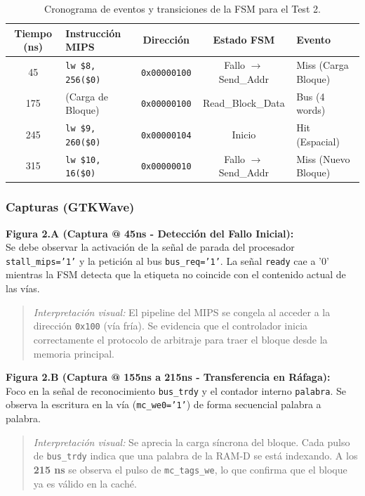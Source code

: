 \documentclass[12pt,a4paper]{article}
\begin{document}
\begin{table}[H]
\centering
\small
\renewcommand{\arraystretch}{1.2}
\begin{tabular}{|c|l|c|c|l|}
\hline
\rowcolor[HTML]{EFEFEF} 
\textbf{Tiempo (ns)} & \textbf{Instrucción MIPS} & \textbf{Dirección} & \textbf{Estado FSM} & \textbf{Evento} \\ \hline
45  & \texttt{lw \$8, 256(\$0)}  & \texttt{0x00000100} & Fallo $\rightarrow$ Send\_Addr & Miss (Carga Bloque) \\ \hline
175 & (Carga de Bloque)          & \texttt{0x00000100} & Read\_Block\_Data     & Bus (4 words)       \\ \hline
245 & \texttt{lw \$9, 260(\$0)}  & \texttt{0x00000104} & Inicio                & Hit (Espacial)      \\ \hline
315 & \texttt{lw \$10, 16(\$0)}  & \texttt{0x00000010} & Fallo $\rightarrow$ Send\_Addr & Miss (Nuevo Bloque) \\ \hline
\end{tabular}
\caption{Cronograma de eventos y transiciones de la FSM para el Test 2.}
\end{table}

\subsubsection{ Capturas (GTKWave)}

\textbf{Figura 2.A (Captura @ 45ns - Detección del Fallo Inicial):} \\
Se debe observar la activación de la señal de parada del procesador \texttt{stall\_mips='1'} y la petición al bus \texttt{bus\_req='1'}. La señal \texttt{ready} cae a '0' mientras la FSM detecta que la etiqueta no coincide con el contenido actual de las vías.
\begin{quote}
    \textit{Interpretación visual:} El pipeline del MIPS se congela al acceder a la dirección \texttt{0x100} (vía fría). Se evidencia que el controlador inicia correctamente el protocolo de arbitraje para traer el bloque desde la memoria principal.
\end{quote}

\textbf{Figura 2.B (Captura @ 155ns a 215ns - Transferencia en Ráfaga):} \\
Foco en la señal de reconocimiento \texttt{bus\_trdy} y el contador interno \texttt{palabra}. Se observa la escritura en la vía (\texttt{mc\_we0='1'}) de forma secuencial palabra a palabra.
\begin{quote}
    \textit{Interpretación visual:} Se aprecia la carga síncrona del bloque. Cada pulso de \texttt{bus\_trdy} indica que una palabra de la RAM-D se está indexando. A los \textbf{215 ns} se observa el pulso de \texttt{mc\_tags\_we}, lo que confirma que el bloque ya es válido en la caché.
\end{quote}
\end{document}
